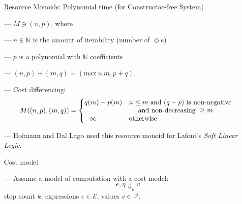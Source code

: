 \documentclass[xetex,serif,mathserif,aspectratio=169]{beamer}
\newcommand{\youtem}{\quad \textcolor{titlered!80}{---} \quad}
\newcommand{\HEAD}[1]{\textcolor{titlered}{#1}}
\begin{document}
\begin{frame}
  \HEAD{Resource Monoids: } Polynomial time (for Constructor-free System)

  \bigskip

  \youtem $M \ni (n, p)$, where \\

  \smallskip

  \quad \youtem $n \in \mathbb{N}$ is the amount of iterability (number of $\Diamond$s)

  \smallskip

  \quad \youtem $p$ is a polynomial with $\mathbb{N}$ coefficients

  \smallskip

  \quad \youtem $(n,p)+(m,q) = (\mathrm{max}~n~m,p+q)$.

  \smallskip

  \quad \youtem Cost differencing:
  \begin{displaymath}
    M((n,p),(m,q)) = \left\{\begin{array}{@{}ll}
                              q(m) - p(m) & n \leq m\textrm{ and }(q-p)\textrm{ is non-negative}\\
                              & \quad\textrm{ and non-decreasing }\geq m \\
                              -\infty      & \textrm{otherwise}
                            \end{array}\right.
                        \end{displaymath}

  \smallskip


  \smallskip

  \youtem Hofmann and Dal Lago used this resource monoid for Lafont's \emph{Soft Linear Logic}.

\end{frame}

\begin{frame}
  \HEAD{Cost model}

  \bigskip

  \youtem Assume a model of computation with a cost model:
  \begin{displaymath}
    e, \eta \Downarrow_k v
  \end{displaymath}
  \qquad\quad step count $k$, expressions $e \in \mathcal{E}$, values $v \in \mathcal{V}$.

\end{frame}
\end{document}

